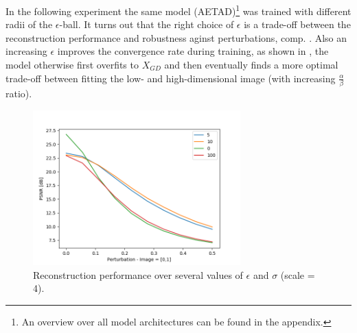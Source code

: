 In the following experiment the same model (AETAD)\footnote{An overview over
all model architectures can be found in the appendix.} was trained with different
radii of the $\epsilon$-ball. It turns out that the right choice of $\epsilon$
is a trade-off between the reconstruction performance and robustness aginst
perturbations, comp. . Also an increasing
$\epsilon$ improves the convergence rate during training, as shown in
, the model otherwise first overfits to $X_{GD}$
and then eventually finds a more optimal trade-off between fitting the
low- and high-dimensional image (with increasing $\frac{\alpha}{\beta}$ ratio).

\begin{figure}[!htbp]
	\centering
	\includegraphics[width=8cm]{figures/epsball_perturbation}
	\caption{Reconstruction performance over several values of $\epsilon$
  and $\sigma$ (scale = 4).}
  \label{fig:epsball_perturbation}
\end{figure}

